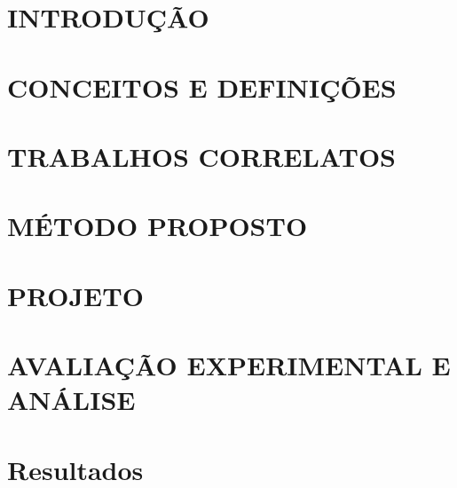 \documentclass[
	12pt,				%
    oneside,			%
	a4paper,			%
	chapter=TITLE,		%
	english,			%
	brazil				%
	]{abntex2}
\begin{document}
\chapter{INTRODUÇÃO}


\chapter{CONCEITOS E DEFINIÇÕES}


\chapter{TRABALHOS CORRELATOS}



\chapter{MÉTODO PROPOSTO}


\chapter{PROJETO}


\chapter{AVALIAÇÃO EXPERIMENTAL E ANÁLISE}



\chapter{Resultados}

\end{document}
